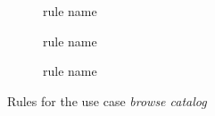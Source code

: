 \begin{example}
\begin{figure}[!ht]
\begin{subfigure}[t]{.5\textwidth}
    \caption{rule name}
  \end{subfigure}
  \begin{subfigure}[t]{.5\textwidth}
    \centerline{}
    \caption{rule name}
  \end{subfigure}%
  \begin{subfigure}[t]{.5\textwidth}
    \centerline{}
    \caption{rule name}
  \end{subfigure}
  \caption{Rules for the use case \emph{browse catalog}}\label{fig:tests:grammar}


\end{figure}
\end{example}
